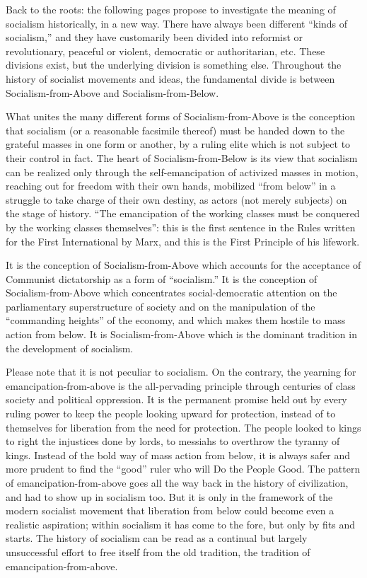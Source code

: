 Back to the roots: the following pages propose to investigate the meaning of socialism historically, in a new way. There have always been different ``kinds of socialism,'' and they have customarily been divided into reformist or revolutionary, peaceful or violent, democratic or authoritarian, etc. These divisions exist, but the underlying division is something else. Throughout the history of socialist movements and ideas, the fundamental divide is between Socialism-from-Above and Socialism-from-Below.

What unites the many different forms of Socialism-from-Above is the conception that socialism (or a reasonable facsimile thereof) must be handed down to the grateful masses in one form or another, by a ruling elite which is not subject to their control in fact. The heart of Socialism-from-Below is its view that socialism can be realized only through the self-emancipation of activized masses in motion, reaching out for freedom with their own hands, mobilized ``from below'' in a struggle to take charge of their own destiny, as actors (not merely subjects) on the stage of history. ``The emancipation of the working classes must be conquered by the working classes themselves'': this is the first sentence in the Rules written for the First International by Marx, and this is the First Principle of his lifework.

It is the conception of Socialism-from-Above which accounts for the acceptance of Communist dictatorship as a form of ``socialism.'' It is the conception of Socialism-from-Above which concentrates social-democratic attention on the parliamentary superstructure of society and on the manipulation of the ``commanding heights'' of the economy, and which makes them hostile to mass action from below. It is Socialism-from-Above which is the dominant tradition in the development of socialism.

Please note that it is not peculiar to socialism. On the contrary, the yearning for emancipation-from-above is the all-pervading principle through centuries of class society and political oppression. It is the permanent promise held out by every ruling power to keep the people looking upward for protection, instead of to themselves for liberation from the need for protection. The people looked to kings to right the injustices done by lords, to messiahs to overthrow the tyranny of kings. Instead of the bold way of mass action from below, it is always safer and more prudent to find the ``good'' ruler who will Do the People Good. The pattern of emancipation-from-above goes all the way back in the history of civilization, and had to show up in socialism too. But it is only in the framework of the modern socialist movement that liberation from below could become even a realistic aspiration; within socialism it has come to the fore, but only by fits and starts. The history of socialism can be read as a continual but largely unsuccessful effort to free itself from the old tradition, the tradition of emancipation-from-above.


